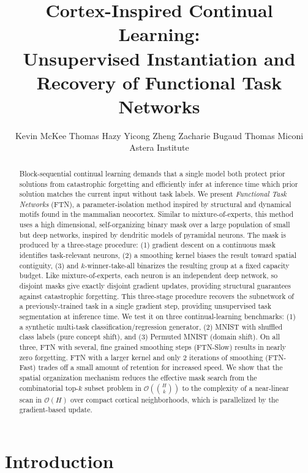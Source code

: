 \documentclass{article}
\title{\textbf{Cortex-Inspired Continual Learning:\\
Unsupervised Instantiation and Recovery of Functional Task Networks}}
\author{%
  Kevin McKee \quad
  Thomas Hazy \quad
  Yicong Zheng \quad
  Zacharie Bugaud \quad
  Thomas Miconi \quad \\
  Astera Institute
}
\date{}
\begin{document}
\maketitle

\begin{abstract}
Block-sequential continual learning demands that a single model both protect prior solutions from catastrophic forgetting and efficiently infer at inference time which prior solution matches the current input without task labels. We present \emph{Functional Task Networks} (FTN), a parameter-isolation method inspired by structural and dynamical motifs found in the mammalian neocortex. Similar to mixture-of-experts, this method uses a high dimensional, self-organizing binary mask over a large population of small but deep networks, inspired by dendritic models of pyramidal neurons. The mask is produced by a three-stage procedure: (1) gradient descent on a continuous mask identifies task-relevant neurons, (2) a smoothing kernel biases the result toward spatial contiguity, (3) and $k$-winner-take-all binarizes the resulting group at a fixed capacity budget. Like mixture-of-experts, each neuron is an independent deep network, so disjoint masks give exactly disjoint gradient updates, providing structural guarantees against catastrophic forgetting. This three-stage procedure recovers the subnetwork of a previously-trained task in a single gradient step, providing unsupervised task segmentation at inference time. We test it on three continual-learning benchmarks: (1) a synthetic multi-task classification/regression generator, (2) MNIST with shuffled class labels (pure concept shift), and (3) Permuted MNIST (domain shift). On all three, FTN with several, fine grained smoothing steps (FTN-Slow) results in nearly zero forgetting. FTN with a larger kernel and only 2 iterations of smoothing (FTN-Fast) trades off a small amount of retention for increased speed. We show that the spatial organization mechanism reduces the effective mask search from the combinatorial top-$k$ subset problem in $\mathcal{O}(\binom{H}{k})$ to the complexity of a near-linear scan in $\mathcal{O}(H)$ over compact cortical neighborhoods, which is parallelized by the gradient-based update.
\end{abstract}

\section{Introduction}
\label{sec:intro}
\end{document}
